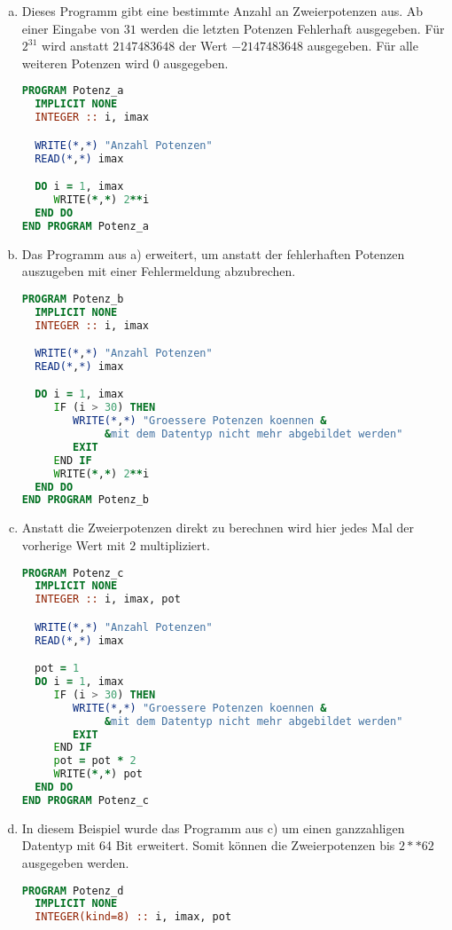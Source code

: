 \documentclass{article}
\begin{document}
\begin{enumerate}[a)]
\item
  Dieses Programm gibt eine bestimmte Anzahl an Zweierpotenzen aus.
  Ab einer Eingabe von $31$ werden die letzten Potenzen Fehlerhaft
  ausgegeben. Für $2^{31}$ wird anstatt $2147483648$ der Wert
  $-2147483648$ ausgegeben. Für alle weiteren Potenzen wird $0$
  ausgegeben.
  \begin{lstlisting}[language=Fortran, showstringspaces=false]
PROGRAM Potenz_a
  IMPLICIT NONE
  INTEGER :: i, imax

  WRITE(*,*) "Anzahl Potenzen"
  READ(*,*) imax

  DO i = 1, imax
     WRITE(*,*) 2**i
  END DO
END PROGRAM Potenz_a
  \end{lstlisting}

\item
  Das Programm aus a) erweitert, um anstatt der fehlerhaften Potenzen auszugeben
  mit einer Fehlermeldung abzubrechen.
  \begin{lstlisting}[language=Fortran, showstringspaces=false]
PROGRAM Potenz_b
  IMPLICIT NONE
  INTEGER :: i, imax

  WRITE(*,*) "Anzahl Potenzen"
  READ(*,*) imax

  DO i = 1, imax
     IF (i > 30) THEN
        WRITE(*,*) "Groessere Potenzen koennen &
             &mit dem Datentyp nicht mehr abgebildet werden"
        EXIT
     END IF
     WRITE(*,*) 2**i
  END DO
END PROGRAM Potenz_b
  \end{lstlisting}

\pagebreak
\item
  Anstatt die Zweierpotenzen direkt zu berechnen wird hier jedes Mal der vorherige Wert
  mit $2$ multipliziert.
  \begin{lstlisting}[language=Fortran, showstringspaces=false]
PROGRAM Potenz_c
  IMPLICIT NONE
  INTEGER :: i, imax, pot

  WRITE(*,*) "Anzahl Potenzen"
  READ(*,*) imax

  pot = 1
  DO i = 1, imax
     IF (i > 30) THEN
        WRITE(*,*) "Groessere Potenzen koennen &
             &mit dem Datentyp nicht mehr abgebildet werden"
        EXIT
     END IF
     pot = pot * 2
     WRITE(*,*) pot
  END DO
END PROGRAM Potenz_c
  \end{lstlisting}

\item
  In diesem Beispiel wurde das Programm aus c) um einen ganzzahligen Datentyp mit 64 Bit erweitert.
  Somit können die Zweierpotenzen bis $2**62$ ausgegeben werden.
  \begin{lstlisting}[language=Fortran, showstringspaces=false]
PROGRAM Potenz_d
  IMPLICIT NONE
  INTEGER(kind=8) :: i, imax, pot


\end{lstlisting}
\end{enumerate}
\end{document}
